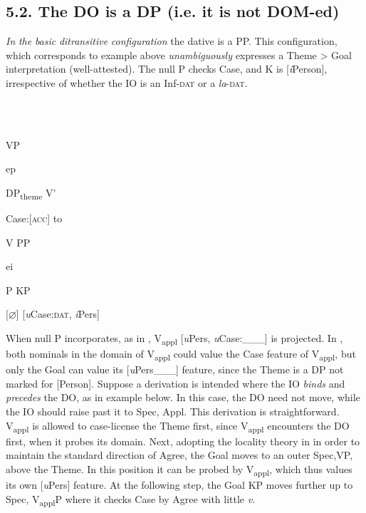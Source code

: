\documentclass[output=paper,modfonts,nonflat]{langsci/langscibook}
\begin{document}
\subsection{\textbf{5.2.} \textbf{The} \textbf{DO} \textbf{is} \textbf{a} \textbf{DP} \textbf{(i.e.} \textbf{it} \textbf{is} \textbf{not} \textbf{DOM-ed)}}

\textit{In} \textit{the} \textit{basic} \textit{ditransitive} \textit{configuration} the dative is a PP. This configuration, which corresponds to example  above \textit{unambiguously} expresses a Theme > Goal interpretation (well-attested). The null P checks Case, and K is [\textit{i}Person], irrespective of whether the IO is an Inf-\textsc{dat} or a \textit{la}{}-\textsc{dat}.

\ea%
    \label{ex:key:31}
    \gll\\
        \\
    \glt
    \z

              VP

                          ep

    DP\textsubscript{theme}        V’

Case:[\textsc{acc}]    to

    V    PP

      ei

      P    KP

            [${\varnothing}$]  [\textit{u}Case:\textsc{dat}, \textit{i}Pers]

When null P incorporates, as in , V\textsubscript{appl} [\textit{u}Pers, \textit{u}Case:\_\_\_] is projected. In , both nominals in the domain of V\textsubscript{appl} could value the Case feature of V\textsubscript{appl}, but only the Goal can value its [\textit{u}Pers\_\_\_] feature, since the Theme is a DP not marked for [Person]. Suppose a derivation is intended where the IO \textit{binds} and \textit{precedes} the DO, as in example  below. In this case, the DO need not move, while the IO should raise past it to Spec, Appl. This derivation is straightforward. V\textsubscript{appl} is allowed to case-license the Theme first, since V\textsubscript{appl} encounters the DO first, when it probes its domain. Next, adopting the locality theory in \citet{Dogget2004} in order to maintain the standard direction of Agree, the Goal moves to an outer Spec,VP, above the Theme. In this position it can be probed by V\textsubscript{appl}, which thus values its own [\textit{u}Pers] feature. At the following step, the Goal KP moves further up to Spec, V\textsubscript{appl}P where it checks Case by Agree with little \textit{v}. 
\end{document}
